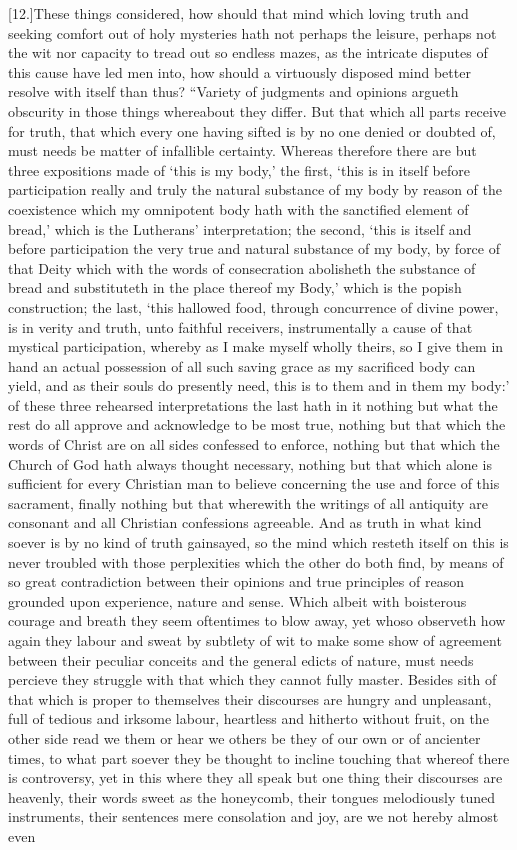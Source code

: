 [12.]These things considered, how should that mind which loving truth and seeking comfort out of holy mysteries hath not perhaps the leisure, perhaps not the wit nor capacity to tread out so endless mazes, as the intricate disputes of this cause have led men into, how should a virtuously disposed mind better resolve with itself than thus? “Variety of judgments and opinions argueth obscurity in those things whereabout they differ. But that which all parts receive for truth, that which every one having sifted is by no one denied or doubted of, must needs be matter of infallible certainty. Whereas therefore there are but three expositions made of ‘this is my body,’ the first, ‘this is in itself before participation really and truly the natural substance of my body by reason of the coexistence which my omnipotent body hath with the sanctified element of bread,’ which is the Lutherans’ interpretation; the second, ‘this is itself and before participation the very true and natural substance of my body, by force of that Deity which with the words of consecration abolisheth the substance of bread and substituteth in the place thereof my Body,’ which is the popish construction; the last, ‘this hallowed food, through concurrence of divine power, is in verity and truth, unto faithful receivers, instrumentally a cause of that mystical participation, whereby as I make myself wholly theirs, so I give them in hand an actual possession of all such saving grace as my sacrificed body can yield, and as their souls do presently need, this is to them and in them my body:’ of these three rehearsed interpretations the last hath in it nothing but what the rest do all approve and acknowledge to be most true, nothing but that which the words of Christ are on all sides confessed to enforce, nothing but that which the Church of God hath always thought necessary, nothing but that which alone is sufficient for every Christian man to believe concerning the use and force of this sacrament, finally nothing but that wherewith the writings of all antiquity are consonant and all Christian confessions agreeable. And as truth in what kind soever is  by no kind of truth gainsayed, so the mind which resteth itself on this is never troubled with those perplexities which the other do both find, by means of so great contradiction between their opinions and true principles of reason grounded upon experience, nature and sense. Which albeit with boisterous courage and breath they seem oftentimes to blow away, yet whoso observeth how again they labour and sweat by subtlety of wit to make some show of agreement between their peculiar conceits and the general edicts of nature, must needs percieve they struggle with that which they cannot fully master. Besides sith of that which is proper to themselves their discourses are hungry and unpleasant, full of tedious and irksome labour, heartless and hitherto without fruit, on the other side read we them or hear we others be they of our own or of ancienter times, to what part soever they be thought to incline touching that whereof there is controversy, yet in this where they all speak but one thing their discourses are heavenly, their words sweet as the honeycomb, their tongues melodiously tuned instruments, their sentences mere consolation and joy, are we not hereby almost even 